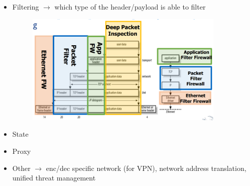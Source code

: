 \documentclass{article}
\begin{document}
      \begin{itemize}
        \item Filtering $\rightarrow$ which type of the header/payload is able to filter
        \begin{figure}[h]
            \centering
            \includegraphics[width=0.90\textwidth]{figure/filtering.png}
        \end{figure}
        \item State
        \item Proxy
        \item Other $\rightarrow$ enc/dec specific network (for VPN), network address translation, unified threat management
      \end{itemize}
\end{document}
